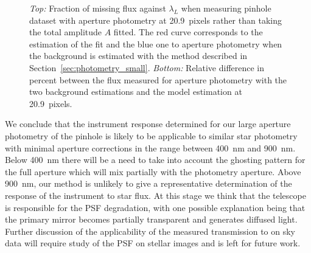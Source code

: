 \begin{figure}[h]
     \centering
     \caption{\textit{Top:} Fraction of missing flux against $\lambda_L$ when measuring \spinhole pinhole dataset with aperture photometry at \SI{20.9}{pixels} rather than taking the total amplitude $A$ fitted. The red curve corresponds to the estimation of the fit and the blue one to aperture photometry when the background is estimated with the method described in Section~\ref{sec:photometry_small}. \textit{Bottom:} Relative difference in percent between the flux measured for aperture photometry with the two background estimations and the model estimation at \SI{20.9}{pixels}.}
     \label{fig:bias_aperture}
\end{figure}

%
% 
We conclude that the instrument response determined for our large aperture photometry of the \spinhole pinhole is likely to be applicable to similar star photometry with minimal aperture corrections in the range between \SI{400}{\nano\meter} and \SI{900}{\nano\meter}. Below \SI{400}{\nano\meter} there will be a need to take into account the ghosting pattern for the full aperture which will mix partially with the photometry aperture. Above \SI{900}{\nano\meter}, our method is unlikely to give a representative determination of the response of the instrument to star flux. At this stage we think that the \SD telescope is responsible for the PSF degradation, with one possible explanation being that the primary mirror becomes partially transparent and generates diffused light. Further discussion of the applicability of the measured transmission to on sky data will require study of the PSF on stellar images and is left for future work.


